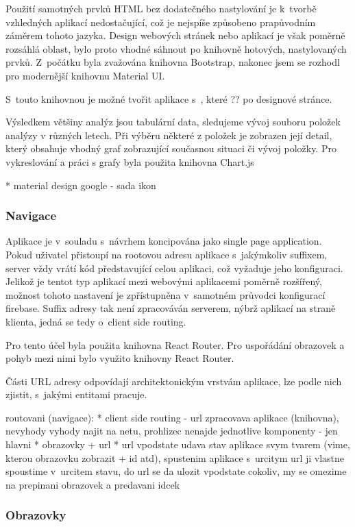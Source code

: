 Použití samotných prvků HTML bez dodatečného nastylování je k~tvorbě vzhledných aplikací nedostačující, což je nejspíše způsobeno prapůvodním záměrem tohoto jazyka. Design webových stránek nebo aplikací je však poměrně rozsáhlá oblast, bylo proto vhodné sáhnout po knihovně hotových, nastylovaných prvků. Z~počátku byla zvažována knihovna Bootstrap, nakonec jsem se rozhodl pro modernější knihovnu Material UI.

S~touto knihovnou je možné tvořit aplikace s~, které ?? po designové stránce.

Výsledkem většiny analýz jsou tabulární data, sledujeme vývoj souboru položek analýzy v různých letech. Při výběru některé z položek je zobrazen její detail, který obsahuje vhodný graf zobrazující současnou situaci či vývoj položky. Pro vykreslování a práci s grafy byla použita knihovna Chart.js


* material design google - sada ikon

\subsubsection{Navigace}
Aplikace je v~souladu s~návrhem koncipována jako single page application. Pokud uživatel přistoupí na rootovou adresu aplikace s~jakýmkoliv suffixem, server vždy vrátí kód představující celou aplikaci, což vyžaduje jeho konfiguraci. Jelikož je tentot typ aplikací mezi webovými aplikacemi poměrně rozšířený, možnost tohoto nastavení je zpřístupněna v~samotném průvodci konfigurací firebase. Suffix adresy tak není zpracováván serverem, nýbrž aplikací na straně klienta, jedná se tedy o~client side routing.



Pro tento účel byla použita knihovna React Router. Pro uspořádání obrazovek a pohyb mezi nimi bylo využito knihovny React Router.

Části URL adresy odpovídají architektonickým vrstvám aplikace, lze podle nich zjistit, s~jakými entitami pracuje.

routovani (navigace):
* client side routing - url zpracovava aplikace (knihovna), nevyhody vyhody najit na netu, prohlizec nenajde jednotlive komponenty - jen hlavni
* obrazovky + url
* url vpodstate udava stav aplikace svym tvarem (vime, kterou obrazovku zobrazit + id atd), spustenim aplikace s~urcitym url ji vlastne spoustime v~urcitem stavu, do url se da ulozit vpodstate cokoliv, my se omezime na prepinani obrazovek a predavani idcek

\subsubsection{Obrazovky}

